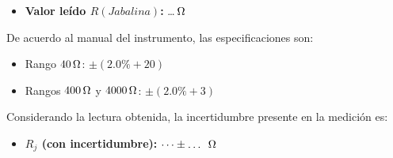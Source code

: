 \begin{itemize}
    \item \textbf{Valor leído $R(Jabalina)$:} \dots $\ohm$
\end{itemize}

De acuerdo al manual del instrumento, las especificaciones son:
\begin{itemize}
    \item Rango $40\ohm$: $\pm(2.0\% + 20)$
    \item Rangos $400\ohm$ y $4000\ohm$: $\pm(2.0\% + 3)$
\end{itemize}

Considerando la lectura obtenida, la incertidumbre presente en la medición es:
\begin{itemize}
    \item \textbf{$R_j$ (con incertidumbre):} $\dots \pm \dots \ \ohm$
\end{itemize}
